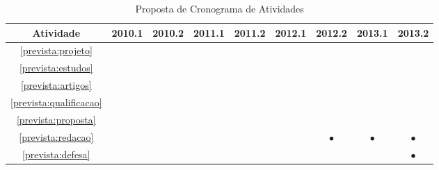 \documentclass{article}
\newcommand{\newrow}{\\\hline}
\newcommand{\x}{$\bullet$}
\begin{document}
\begin{table}[h]
  \centering
  \begin{tabular}{|c|c|c|c|c|c|c|c|c|} \hline
    Atividade                   & 2010.1 & 2010.2 & 2011.1 & 2011.2  & 2012.1 & 2012.2  & 2013.1 & 2013.2 \newrow
    \ref{prevista:projeto}      &        &        &        &         &        &         &        &        \newrow
    \ref{prevista:estudos}      &        &        &        &         &        &         &        &        \newrow
    \ref{prevista:artigos}      &        &        &        &         &        &         &        &        \newrow
    \ref{prevista:qualificacao} &        &        &        &         &        &         &        &        \newrow
    \ref{prevista:proposta}     &        &        &        &         &        &         &        &        \newrow
    \ref{prevista:redacao}      &        &        &        &         &        & \x      & \x     & \x     \newrow
    \ref{prevista:defesa}       &        &        &        &         &        &         &        & \x     \newrow
  \end{tabular}
 \caption{Proposta de Cronograma de Atividades}
 \label{tab:cronograma}
\end{table}




\end{document}
